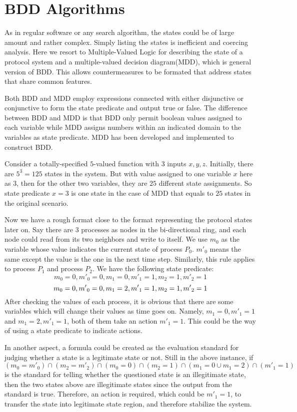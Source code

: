 \section{BDD Algorithms}
As in regular software or any search algorithm, the states could be of large amount and rather complex. Simply listing the states is inefficient and coercing analysis. Here we resort to Multiple-Valued Logic for describing the state of a protocol system and a multiple-valued decision diagram(MDD), which is general version of BDD. This allows countermeasures to be formated that address states that share common features. 

Both BDD and MDD employ expressions connected with either disjunctive or conjunctive to form the state predicate and output true or false. The difference between BDD and MDD is that BDD only permit boolean values assigned to each variable while MDD assigns numbers within an indicated domain to the variables as state predicate. MDD has been developed and implemented to construct BDD. 

Consider a totally-specified $5$-valued function with $3$ inputs $x, y, z$. Initially, there are $5^3 = 125$ states in the system. But with value assigned to one variable $x$ here as $3$, then for the other two variables, they are $25$ different state assignments. So state predicate $x=3$ is one state in the case of MDD that equals to $25$ states in the original scenario. 

Now we have a rough format close to the format representing the protocol states later on. Say there are 3 processes as nodes in the bi-directional ring, and each node could read from its two neighbors and write to itself. We use $m_0$ as the variable whose value indicates the current state of process $P_0$. ${m'}_0$ means the same except the value is the one in the next time step. Similarly, this rule applies to process $P_1$ and process $P_2$. We have the following state predicate:
\[
    m_0 = 0, {m'}_0 = 0, m_1 = 0, {m'}_1 = 1, m_2 = 1, {m'}_2 = 1
\]
\[
    m_0 = 0, {m'}_0 = 0, m_1 = 2, {m'}_1 = 1, m_2 = 1, {m'}_2 = 1\\
\]
After checking the values of each process, it is obvious that there are some variables which will change their values as time goes on. Namely, $m_1 = 0, {m'}_1 = 1$ and $m_1 = 2, {m'}_1 = 1$, both of them take an action ${m'}_1 = 1$. This could be the way of using a state predicate to indicate actions.

In another aspect, a formula could be created as the evaluation standard for judging whether a state is a legitimate state or not. Still in the above instance, if $(m_0={m'}_0)\cap (m_2={m'}_2)\cap (m_0=0)\cap (m_2=1)\cap (m_1=0\cup m_1=2)\cap ({m'}_1=1)$ is the standard for telling whether the questioned state is an illegitimate state, then the two states above are illegitimate states since the output from the standard is true. Therefore, an action is required, which could be ${m'}_1=1$, to transfer the state into legitimate state region, and therefore stabilize the system.

